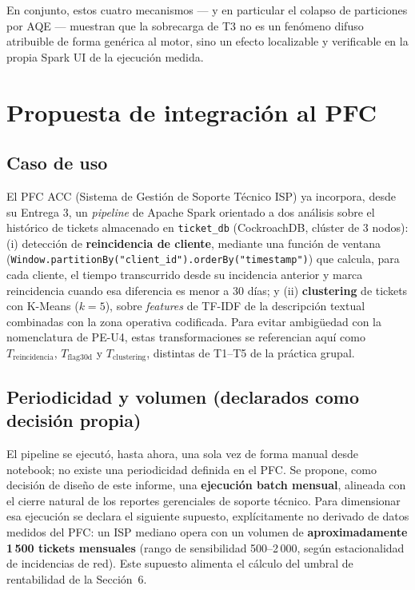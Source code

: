 \documentclass[11pt]{article}
\begin{document}
En conjunto, estos cuatro mecanismos --- y en particular el colapso de
particiones por AQE --- muestran que la sobrecarga de T3 no es un
fenómeno difuso atribuible de forma genérica al motor, sino un efecto
localizable y verificable en la propia Spark UI de la ejecución medida.


\section{Propuesta de integración al PFC}


\subsection{Caso de uso}

El PFC ACC (Sistema de Gestión de Soporte Técnico ISP) ya incorpora,
desde su Entrega 3, un \emph{pipeline} de Apache Spark orientado a dos
análisis sobre el histórico de tickets almacenado en
\texttt{ticket\_db} (CockroachDB, clúster de 3 nodos): (i) detección de
\textbf{reincidencia de cliente}, mediante una función de ventana
(\texttt{Window.partitionBy("client\_id").orderBy("timestamp")}) que
calcula, para cada cliente, el tiempo transcurrido desde su incidencia
anterior y marca reincidencia cuando esa diferencia es menor a 30 días;
y (ii) \textbf{clustering} de tickets con K-Means ($k=5$), sobre
\emph{features} de TF-IDF de la descripción textual combinadas con la
zona operativa codificada. Para evitar ambigüedad con la nomenclatura de
PE-U4, estas transformaciones se referencian aquí como
$T_{\mathrm{reincidencia}}$, $T_{\mathrm{flag30d}}$ y
$T_{\mathrm{clustering}}$, distintas de T1--T5 de la práctica grupal.

\subsection{Periodicidad y volumen (declarados como decisión propia)}

El pipeline se ejecutó, hasta ahora, una sola vez de forma manual desde
notebook; no existe una periodicidad definida en el PFC. Se propone,
como decisión de diseño de este informe, una \textbf{ejecución batch
mensual}, alineada con el cierre natural de los reportes gerenciales de
soporte técnico. Para dimensionar esa ejecución se declara el siguiente
supuesto, explícitamente no derivado de datos medidos del PFC: un ISP
mediano opera con un volumen de \textbf{aproximadamente 1\,500 tickets
mensuales} (rango de sensibilidad 500--2\,000, según estacionalidad de
incidencias de red). Este supuesto alimenta el cálculo del umbral de
rentabilidad de la Sección~6.
\end{document}
